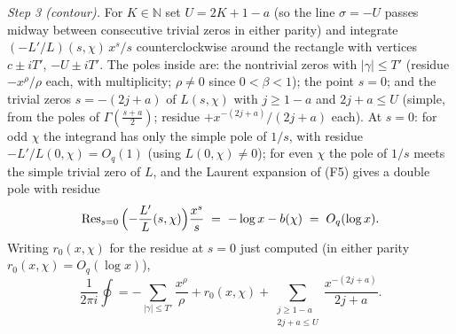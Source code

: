 \emph{Step 3 (contour).} For $K\in\mathbb N$ set $U=2K+1-a$ (so the
line $\sigma=-U$ passes midway between consecutive trivial zeros in
either parity) and integrate
$(-L'/L)(s,\chi)\,x^s/s$ counterclockwise around the rectangle with
vertices $c\pm iT'$, $-U\pm iT'$. The poles inside are: the nontrivial
zeros with $|\gamma|\le T'$ (residue $-x^\rho/\rho$ each, with
multiplicity; $\rho\ne0$ since $0<\beta<1$); the point $s=0$; and the
trivial zeros $s=-(2j+a)$ of $L(s,\chi)$ with $j\ge1-a$ and
$2j+a\le U$ (simple, from the poles of $\Gamma(\tfrac{s+a}2)$; residue
$+x^{-(2j+a)}/(2j+a)$ each). At $s=0$: for odd $\chi$ the integrand
has only the simple pole of $1/s$, with residue
$-L'/L(0,\chi)=O_q(1)$ (using $L(0,\chi)\ne0$); for even $\chi$ the
pole of $1/s$ meets the simple trivial zero of $L$, and the Laurent
expansion of (F5) gives a double pole with residue
\[
\mathrm{Res}_{s=0}\,\Bigl(-\frac{L'}{L}(s,\chi)\Bigr)\frac{x^s}{s}
\;=\;-\log x-b(\chi)\;=\;O_q(\log x).
\]
Writing $r_0(x,\chi)$ for the residue at $s=0$ just computed (in
either parity $r_0(x,\chi)=O_q(\log x)$),
\[
\frac{1}{2\pi i}\oint
=-\sum_{|\gamma|\le T'}\frac{x^\rho}{\rho}+r_0(x,\chi)
+\sum_{\substack{j\ge1-a\\ 2j+a\le U}}\frac{x^{-(2j+a)}}{2j+a}.
\]

